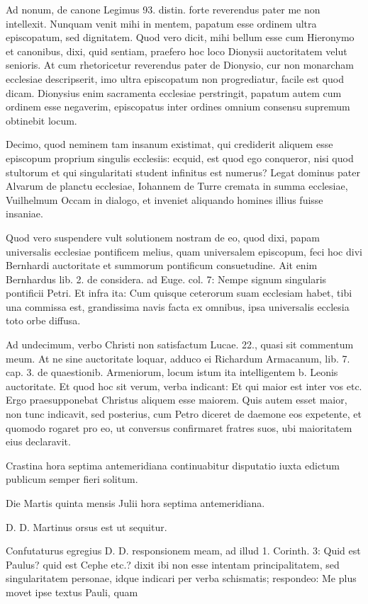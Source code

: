 Ad nonum, de canone Legimus 93. distin. forte reverendus pater me non intellexit. Nunquam venit mihi in mentem, papatum esse ordinem ultra episcopatum, sed dignitatem. Quod vero dicit, mihi bellum esse cum Hieronymo et canonibus, dixi, quid sentiam, praefero hoc loco Dionysii auctoritatem velut senioris. At cum rhetoricetur reverendus pater de Dionysio, cur non monarcham ecclesiae descripserit, imo ultra episcopatum non progrediatur, facile est quod dicam. Dionysius enim sacramenta ecclesiae perstringit, papatum autem cum ordinem esse negaverim, episcopatus inter ordines omnium consensu supremum obtinebit locum.

Decimo, quod neminem tam insanum existimat, qui crediderit aliquem esse episcopum proprium singulis ecclesiis: ecquid, est quod ego conqueror, nisi quod stultorum et qui singularitati student infinitus est numerus? Legat dominus pater Alvarum de planctu ecclesiae, Iohannem de Turre cremata in summa ecclesiae, Vuilhelmum Occam in dialogo, et inveniet aliquando homines illius fuisse insaniae.

Quod vero suspendere vult solutionem nostram de eo, quod dixi, papam universalis ecclesiae pontificem melius, quam universalem episcopum, feci hoc divi Bernhardi auctoritate et summorum pontificum consuetudine. Ait enim Bernhardus lib. 2. de considera. ad Euge. col. 7: Nempe signum singularis pontificii Petri. Et infra ita: Cum quisque ceterorum suam ecclesiam habet, tibi una commissa est, grandissima navis facta ex omnibus, ipsa universalis ecclesia toto orbe diffusa.

Ad undecimum, verbo Christi non satisfactum Lucae. 22., quasi sit commentum meum. At ne sine auctoritate loquar, adduco ei Richardum Armacanum, lib. 7. cap. 3. de quaestionib. Armeniorum, locum istum ita intelligentem \marginpar{\small[271]} b. Leonis auctoritate. Et quod hoc sit verum, verba indicant: Et qui maior est inter vos etc. Ergo praesupponebat Christus aliquem esse maiorem. Quis autem esset maior, non tunc indicavit, sed posterius, cum Petro diceret de daemone eos expetente, et quomodo rogaret pro eo, ut conversus confirmaret fratres suos, ubi maioritatem eius declaravit.

Crastina hora septima antemeridiana continuabitur disputatio iuxta edictum publicum semper fieri solitum.

Die Martis quinta mensis Julii hora septima antemeridiana.

D. D. Martinus orsus est ut sequitur.

Confutaturus egregius D. D. responsionem meam, ad illud 1. Corinth. 3: Quid est Paulus? quid est Cephe etc.? dixit ibi non esse intentam principalitatem, sed singularitatem personae, idque indicari per verba schismatis; respondeo: Me plus movet ipse textus Pauli, quam


